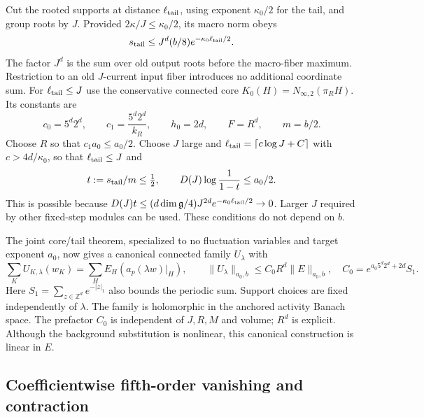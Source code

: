 Cut the rooted supports at distance $\ell_{\rm tail}$, using
exponent $\kappa_0/2$ for the tail, and group roots by $J$.
Provided $2\kappa/J\leq\kappa_0/2$, its macro norm obeys
\begin{equation}
 s_{\rm tail}\leq J^d(b/8)e^{-\kappa_0\ell_{\rm tail}/2}.
 \label{cdh-tail}
\end{equation}
The factor $J^d$ is the sum over old output roots before the
macro-fiber maximum. Restriction to an old $J$-current input
fiber introduces no additional coordinate sum.
For $\ell_{\rm tail}\leq J$ use the conservative connected core
$K_0(H)=N_{\infty,2}(\pi_RH)$. Its constants are
\begin{equation}
 c_0=5^d2^d,\qquad c_1=\frac{5^d2^d}{k_R},\qquad
 h_0=2d,\qquad F=R^d,\qquad m=b/2.
 \label{cdh-core-constants}
\end{equation}
Choose $R$ so that $c_1a_0\leq a_0/2$.
Choose $J$ large and
$\ell_{\rm tail}=\lceil c\log J+C\rceil$ with
$c>4d/\kappa_0$, so that $\ell_{\rm tail}\leq J$ and
\begin{equation}
 t:=s_{\rm tail}/m\leq\tfrac12,\qquad
 D(J)\log\frac1{1-t}\leq a_0/2.
 \label{cdh-tail-budget}
\end{equation}
This is possible because
$D(J)t\leq(d\dim\mathfrak g/4)J^{2d}
e^{-\kappa_0\ell_{\rm tail}/2}\to0$.
Larger $J$ required by other fixed-step modules can be used.
These conditions do not depend on $b$.

The joint core/tail theorem, specialized to no fluctuation
variables and target exponent $a_0$, now gives a canonical
connected family $U_\lambda$ with
\begin{equation}
 \sum_KU_{K,\lambda}(w_K)
   =\sum_HE_H(a_p(\lambda w)|_H),\qquad
 \|U_\lambda\|_{a_0,b}\leq C_0R^d\|E\|_{a_0,b},
 \quad
 C_0=e^{a_0 5^d2^d+2d}S_1.
 \label{cdh-uniform-transport}
\end{equation}
Here $S_1=\sum_{z\in\mathbb Z^d}e^{-|z|_1}$ also bounds the
periodic sum. Support choices are fixed independently of
$\lambda$. The family is holomorphic in the anchored activity
Banach space. The prefactor $C_0$ is independent of $J,R,M$ and
volume; $R^d$ is explicit. Although the background substitution
is nonlinear, this canonical construction is linear in $E$.

\subsection{Coefficientwise fifth-order vanishing and contraction}
\label{cdh-contraction-section}

